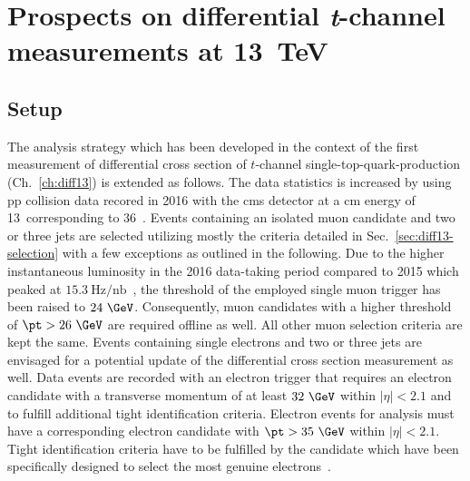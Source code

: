 \chapter{Prospects on differential \textsl{t}-channel measurements at 13~TeV}
\label{ch:prospects}




\section{Setup}

The analysis strategy which has been developed in the context of the first measurement of differential cross section of $t$-channel single-top-quark-production (Ch.~\ref{ch:diff13}) is extended as follows. The data statistics is increased by using \gls{pp} collision data recored in 2016 with the \gls{cms} detector at a \acrlong{cm} energy of 13~\TeV corresponding to 36~\invfb. Events containing an isolated muon candidate and two or three jets are selected utilizing mostly the criteria detailed in Sec.~\ref{sec:diff13-selection} with a few exceptions as outlined in the following. Due to the higher instantaneous luminosity in the 2016 data-taking period compared to 2015 which peaked at $15.3~\mathrm{Hz}/\mathrm{nb}$~\cite{lumipublic}, the threshold of the employed single muon trigger has been raised to $24~\GeV$. Consequently, muon candidates with a higher threshold of $\pt>26~\GeV$ are required offline as well. All other muon selection criteria are kept the same. Events containing single electrons and two or three jets are envisaged for a potential update of the differential cross section measurement as well. Data events are recorded with an electron trigger that requires an electron candidate with a transverse momentum of at least $32~\GeV$ within $|\eta|<2.1$ and to fulfill additional tight identification criteria. Electron events for analysis must have a corresponding electron candidate with $\pt>35~\GeV$ within $|\eta|<2.1$. Tight identification criteria have to be fulfilled by the candidate which have been specifically designed to select the most genuine electrons~\cite{CMS-DP-2017-004}.


